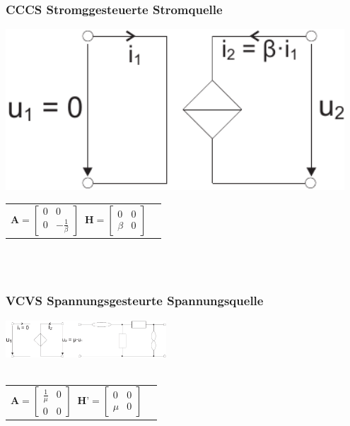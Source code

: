 \documentclass[a4paper,twocolumn,10pt]{article}
\begin{document}
\subsubsection*{CCCS Stromggesteuerte Stromquelle}
\begin{minipage}[b]{0.23\textwidth}
\includegraphics[width=0.95\textwidth]{img/OP_ISI}
\end{minipage}
\hfill
\begin{minipage}[b]{0.23\textwidth}
\begin{tabular}{ll}
$\textbf{A}=\begin{bmatrix}0 & 0\\ 0 & -\frac{1}{\beta}\end{bmatrix}\;\;\textbf{H}=\begin{bmatrix}0 & 0\\ \beta & 0\end{bmatrix}$
\end{tabular}\\\\
\end{minipage}

\subsubsection*{VCVS Spannungsgesteurte Spannungsquelle}
\includegraphics[width=0.45\textwidth]{img/OP_USU}\\\\
\begin{tabular}{ll}
$\textbf{A}=\begin{bmatrix}\frac{1}{\mu} & 0\\ 0 & 0\end{bmatrix}\;\;\textbf{H'}=\begin{bmatrix}0 & 0\\ \mu & 0\end{bmatrix}$
\end{tabular}
\end{document}
